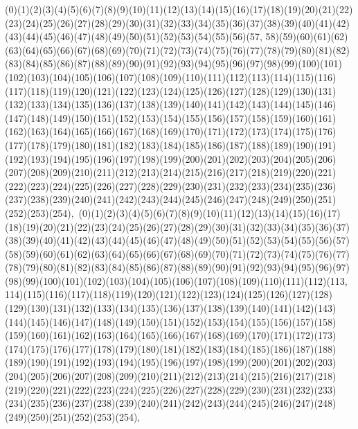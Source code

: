 \documentclass[12pt]{article}
\begin{document}
{(0)(1)(2)(3)(4)(5)(6)(7)(8)(9)(10)(11)(12)(13)(14)(15)(16)(17)(18)(19)(20)(21)(22)(23)(24)(25)(26)(27)(28)(29)(30)(31)(32)(33)(34)(35)(36)(37)(38)(39)(40)(41)(42)(43)(44)(45)(46)(47)(48)(49)(50)(51)(52)(53)(54)(55)(56)(57, 58)(59)(60)(61)(62)(63)(64)(65)(66)(67)(68)(69)(70)(71)(72)(73)(74)(75)(76)(77)(78)(79)(80)(81)(82)(83)(84)(85)(86)(87)(88)(89)(90)(91)(92)(93)(94)(95)(96)(97)(98)(99)(100)(101)(102)(103)(104)(105)(106)(107)(108)(109)(110)(111)(112)(113)(114)(115)(116)(117)(118)(119)(120)(121)(122)(123)(124)(125)(126)(127)(128)(129)(130)(131)(132)(133)(134)(135)(136)(137)(138)(139)(140)(141)(142)(143)(144)(145)(146)(147)(148)(149)(150)(151)(152)(153)(154)(155)(156)(157)(158)(159)(160)(161)(162)(163)(164)(165)(166)(167)(168)(169)(170)(171)(172)(173)(174)(175)(176)(177)(178)(179)(180)(181)(182)(183)(184)(185)(186)(187)(188)(189)(190)(191)(192)(193)(194)(195)(196)(197)(198)(199)(200)(201)(202)(203)(204)(205)(206)(207)(208)(209)(210)(211)(212)(213)(214)(215)(216)(217)(218)(219)(220)(221)(222)(223)(224)(225)(226)(227)(228)(229)(230)(231)(232)(233)(234)(235)(236)(237)(238)(239)(240)(241)(242)(243)(244)(245)(246)(247)(248)(249)(250)(251)(252)(253)(254)$
, 
$
(0)(1)(2)(3)(4)(5)(6)(7)(8)(9)(10)(11)(12)(13)(14)(15)(16)(17)(18)(19)(20)(21)(22)(23)(24)(25)(26)(27)(28)(29)(30)(31)(32)(33)(34)(35)(36)(37)(38)(39)(40)(41)(42)(43)(44)(45)(46)(47)(48)(49)(50)(51)(52)(53)(54)(55)(56)(57)(58)(59)(60)(61)(62)(63)(64)(65)(66)(67)(68)(69)(70)(71)(72)(73)(74)(75)(76)(77)(78)(79)(80)(81)(82)(83)(84)(85)(86)(87)(88)(89)(90)(91)(92)(93)(94)(95)(96)(97)(98)(99)(100)(101)(102)(103)(104)(105)(106)(107)(108)(109)(110)(111)(112)(113, 114)(115)(116)(117)(118)(119)(120)(121)(122)(123)(124)(125)(126)(127)(128)(129)(130)(131)(132)(133)(134)(135)(136)(137)(138)(139)(140)(141)(142)(143)(144)(145)(146)(147)(148)(149)(150)(151)(152)(153)(154)(155)(156)(157)(158)(159)(160)(161)(162)(163)(164)(165)(166)(167)(168)(169)(170)(171)(172)(173)(174)(175)(176)(177)(178)(179)(180)(181)(182)(183)(184)(185)(186)(187)(188)(189)(190)(191)(192)(193)(194)(195)(196)(197)(198)(199)(200)(201)(202)(203)(204)(205)(206)(207)(208)(209)(210)(211)(212)(213)(214)(215)(216)(217)(218)(219)(220)(221)(222)(223)(224)(225)(226)(227)(228)(229)(230)(231)(232)(233)(234)(235)(236)(237)(238)(239)(240)(241)(242)(243)(244)(245)(246)(247)(248)(249)(250)(251)(252)(253)(254)$
, 
$
}
\end{document}
